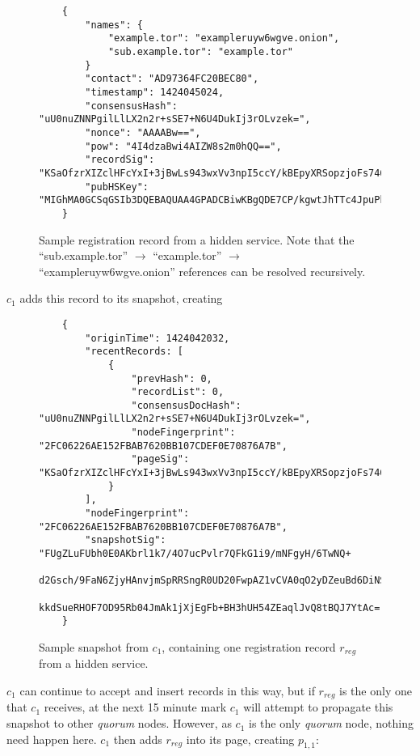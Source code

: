 \begin{figure}
	\begin{lstlisting}
	{
		"names": {
			"example.tor": "exampleruyw6wgve.onion",
			"sub.example.tor": "example.tor"
		}
		"contact": "AD97364FC20BEC80",
		"timestamp": 1424045024,
		"consensusHash": "uU0nuZNNPgilLlLX2n2r+sSE7+N6U4DukIj3rOLvzek=",
		"nonce": "AAAABw==",
		"pow": "4I4dzaBwi4AIZW8s2m0hQQ==",
		"recordSig": 	"KSaOfzrXIZclHFcYxI+3jBwLs943wxVv3npI5ccY/kBEpyXRSopzjoFs746n0tJqUpdY4Kbe6DBwERaN7ELmSSK9Pu6q8QeKzNAh+QOnKl0fKBN7fqowjkQ3ktFkR0Vuox9WrrbNTMa4+up0Np52hlbKA3zSRz4fbR9NVlh6uuQ=",
		"pubHSKey": "MIGhMA0GCSqGSIb3DQEBAQUAA4GPADCBiwKBgQDE7CP/kgwtJhTTc4JpuPkvA7Ln9wgc+fgTKgkyUp1zusxgUAn1c1MGx4YhO42KPB7dyZOf3pcRk94XsYFY1ULkF2+tf9KdNe7GFzJyMFCQENnUcVXbcwLH4vAeiGK7R/nScbCbyc9LT+VE1fbKchTL1QzLVBLqJTxhR+9YPi8x+QIFAdZ8BJs="
	}
	\end{lstlisting}
	\caption{Sample registration record from a hidden service. Note that the ``sub.example.tor'' $ \to $ ``example.tor'' $ \to $ ``exampleruyw6wgve.onion'' references can be resolved recursively.}
	\label{sampleLabel}
\end{figure}

$ c_{1} $ adds this record to its snapshot, creating

\begin{figure}
	\begin{lstlisting}
	{
		"originTime": 1424042032,
		"recentRecords: [
			{
				"prevHash": 0,
				"recordList": 0,
				"consensusDocHash": "uU0nuZNNPgilLlLX2n2r+sSE7+N6U4DukIj3rOLvzek=",
				"nodeFingerprint": "2FC06226AE152FBAB7620BB107CDEF0E70876A7B",
				"pageSig": 	"KSaOfzrXIZclHFcYxI+3jBwLs943wxVv3npI5ccY/kBEpyXRSopzjoFs746n0tJqUpdY4Kbe6DBwERaN7ELmSSK9Pu6q8QeKzNAh+QOnKl0fKBN7fqowjkQ3ktFkR0Vuox9WrrbNTMa4+up0Np52hlbKA3zSRz4fbR9NVlh6uuQ="
			}
		],
		"nodeFingerprint": "2FC06226AE152FBAB7620BB107CDEF0E70876A7B",
		"snapshotSig": "FUgZLuFUbh0E0AKbrl1k7/4O7ucPvlr7QFkG1i9/mNFgyH/6TwNQ+
			d2Gsch/9FaN6ZjyHAnvjmSpRRSngR0UD20FwpAZ1vCVA0qO2yDZeuBd6DiNS
			kkdSueRHOF7OD95Rb04JmAk1jXjEgFb+BH3hUH54ZEaqlJvQ8tBQJ7YtAc="
	}
	\end{lstlisting}
	\caption{Sample snapshot from $ c_{1} $, containing one registration record $ r_{reg} $ from a hidden service.}
	\label{sampleLabel}
\end{figure}

$ c_{1} $ can continue to accept and insert records in this way, but if $ r_{reg} $ is the only one that $ c_{1} $ receives, at the next 15 minute mark $ c_{1} $ will attempt to propagate this snapshot to other \emph{quorum} nodes. However, as $ c_{1} $ is the only \emph{quorum} node, nothing need happen here. $ c_{1} $ then adds $ r_{reg} $ into its page, creating $ p_{1,1} $:

